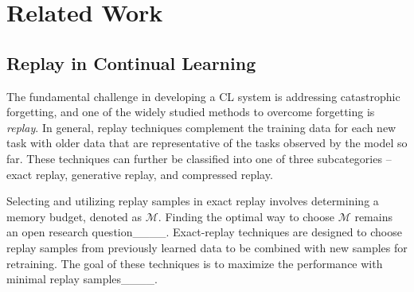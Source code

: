 \section{Related Work}
\label{related_work}





\subsection{Replay in Continual Learning}
The fundamental challenge in developing a CL system is addressing catastrophic forgetting, and one of the widely studied methods to overcome forgetting is {\em replay}. In general, replay techniques complement the training data for each new task with older data that are representative of the tasks observed by the model so far. These techniques can further be classified into one of three subcategories -- exact replay, generative replay, and compressed replay. 


Selecting and utilizing replay samples in exact replay involves determining a memory budget, denoted as $\mathcal{M}$. Finding the optimal way to choose $\mathcal{M}$ remains an open research question____. Exact-replay techniques are designed to choose replay samples from previously learned data to be combined with new samples for retraining. The goal of these techniques is to maximize the performance with minimal replay samples____. 




